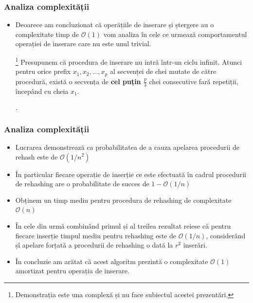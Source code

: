 \documentclass{beamer}
\begin{document}
\begin{frame}
\frametitle{Analiza complexității}
\begin{itemize}
\item Deoarece am concluzionat că operățiile de inserare și ștergere au o complexitate timp de $\mathcal{O}(1)$ vom analiza în cele ce urmează comportamentul operației de inserare care nu este unul trivial.

\begin{lemma}[]
\footnote{Demonstrația este una complexă și nu face subiectul acestei prezentări.}
Presupunem că procedura de inserare nu intră într-un ciclu infinit. Atunci pentru orice prefix $x_1, x_2, ..., x_p$ al secvenței de chei mutate de către procedură, există o secvența de \textbf{cel puțin $\frac{p}{3}$} chei consecutive fară repetiții, începând cu cheia $x_1$.
\end{lemma}.

\end{itemize}
\end{frame}
\begin{frame}
\frametitle{Analiza complexității}
\begin{itemize}

\item Lucrarea demonstrează ca probabilitatea de a cauza apelarea procedurii de rehash este de $\mathcal{O}(1/n^2)$

\item În particular fiecare operație de inserție ce este efectuată în cadrul procedurii de rehashing are o probabilitate de succes de $1 - \mathcal{O}(1/n)$

\item Obținem un timp mediu pentru procedura de rehashing de complexitate $\mathcal{O}(n)$ 

\item În cele din urmă combinând primul și al treilea rezultat reiese că pentru fiecare inserție timpul mediu pentru rehashing este de $\mathcal{O}(1/n)$, considerând șî apelare forțată a procedurii de rehashing o dată la $r^2$ inserări.

\item În concluzie am arătat că acest algoritm prezintă o complexitate $\mathcal{O}(1)$ amortizat pentru operația de inserare.
\end{itemize}
\end{frame}
\end{document}
